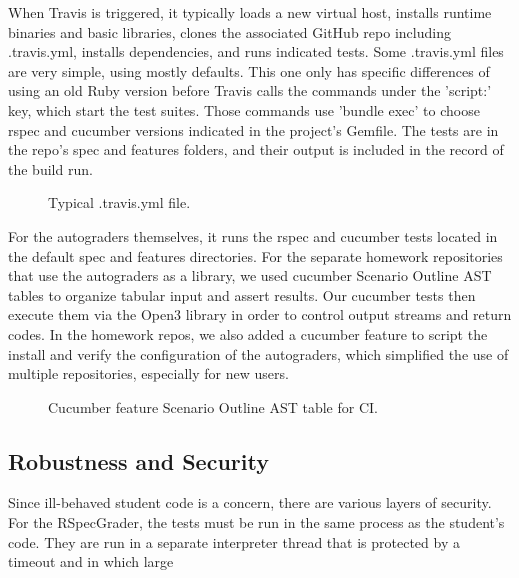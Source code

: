 When Travis is triggered, it typically loads a new virtual host, installs runtime binaries and basic libraries, clones the associated GitHub repo including .travis.yml, installs dependencies, and runs indicated tests.
Some .travis.yml files are very simple, using mostly defaults. This one only has specific differences of using an old Ruby version before Travis calls the commands under the 'script:' key, which start the test suites. Those commands use 'bundle exec' to choose rspec and cucumber versions indicated in the project's Gemfile. The tests are in the repo's spec and features folders, and their output is included in the record of the build run.

\begin{figure}[!htbp]
  \begin{minipage}{0.70\textwidth}%
  \lstset{tabsize=1,basicstyle=\scriptsize\ttfamily}
  \end{minipage}
  \caption{\label{fig:rag-ci}%
  Typical .travis.yml file.
}
\end{figure}

For the autograders themselves, it runs the rspec and cucumber tests located in the default spec and features directories. For the separate homework repositories that use the autograders as a library, we used cucumber Scenario Outline AST tables to organize tabular input and assert results. Our cucumber tests then execute them via the Open3 library in order to control output streams and return codes. In the homework repos, we also added a cucumber feature to script the install and verify the configuration of the autograders, which simplified the use of multiple repositories, especially for new users.

\begin{figure}[!htbp]
  \begin{minipage}{0.99\textwidth}%
  \lstset{tabsize=1,basicstyle=\scriptsize\ttfamily}
  \end{minipage}
  \caption{\label{fig:rag-ci}%
  Cucumber feature Scenario Outline AST table for CI.
}
\end{figure}


\subsection{Robustness and Security}

Since ill-behaved student code is a concern, there are various layers of
security.  For the RSpecGrader, the tests must be run in the same
process as the student's code.  They are run in a separate interpreter
thread that is protected by a timeout and in which large 

